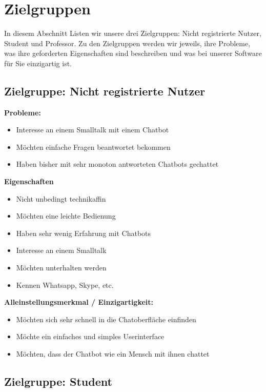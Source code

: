 \section{Zielgruppen}
In diesem Abschnitt Listen wir unsere drei Zielgruppen: Nicht registrierte Nutzer, Student und Professor.
Zu den Zielgruppen werden wir jeweils, ihre Probleme, was ihre geforderten Eigenschaften sind beschreiben und was bei unserer Software für Sie 
einzigartig ist.


\subsection{Zielgruppe: Nicht registrierte Nutzer}

\textbf{Probleme:}
\begin{itemize}
    \item Interesse an einem Smalltalk mit einem Chatbot
    \item Möchten einfache Fragen beantwortet bekommen
    \item Haben bisher mit sehr monoton antworteten Chatbots gechattet
\end{itemize}
\medskip

\textbf{Eigenschaften}
\begin{itemize}
    \item Nicht unbedingt technikaffin
    \item Möchten eine leichte Bedienung
    \item Haben sehr wenig Erfahrung mit Chatbots
    \item Interesse an einem Smalltalk
    \item Möchten unterhalten werden
    \item Kennen Whatsapp, Skype, etc.
\end{itemize}
\medskip

\textbf{Alleinstellungsmerkmal / Einzigartigkeit:}
\begin{itemize}
    \item Möchten sich sehr schnell in die Chatoberfläche einfinden
    \item Möchte ein einfaches und simples Userinterface
    \item Möchten, dass der Chatbot wie ein Mensch mit ihnen chattet
\end{itemize}

\newpage
\subsection{Zielgruppe: Student}

